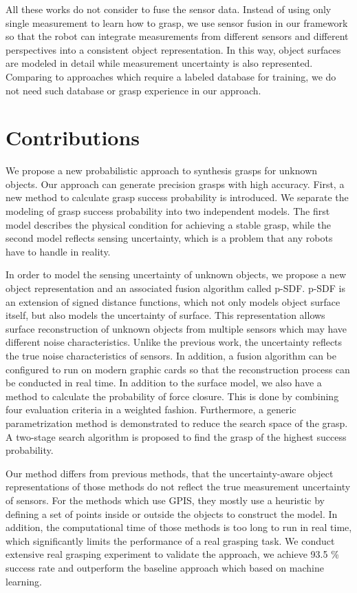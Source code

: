 All these works do not consider to fuse the sensor data. Instead of using only single measurement to learn how to grasp, we use sensor fusion in our framework so that the robot can integrate measurements from different sensors and different perspectives into a consistent object representation.  In this way, object surfaces are modeled in detail while measurement uncertainty is also represented. Comparing to approaches which require a labeled database for training, we do not need such database or grasp experience in our approach.  

\section{Contributions}
We propose a new probabilistic approach to synthesis grasps for unknown objects. Our approach can generate precision grasps with high accuracy. First, a new method to calculate grasp success probability is introduced. We separate the modeling of grasp success probability into two independent models. The first model describes the physical condition for achieving a stable grasp, while the second model reflects sensing uncertainty, which is a problem that any robots have to handle in reality. 

In order to model the sensing uncertainty of unknown objects, we propose a new object representation and an associated fusion algorithm called p-SDF. p-SDF is an extension of signed distance functions, which not only models object surface itself, but also models the uncertainty of surface. This representation allows surface reconstruction of unknown objects from multiple sensors which may have different noise characteristics. Unlike the previous work, the uncertainty reflects the true noise characteristics of sensors. In addition, a fusion algorithm can be configured to run on modern graphic cards so that the reconstruction process can be conducted in real time. In addition to the surface model, we also have a method to calculate the probability of force closure. This is done by combining four evaluation criteria in a weighted fashion. Furthermore, a generic parametrization method is demonstrated to reduce the search space of the grasp. A two-stage search algorithm is proposed to find the grasp of the highest success probability. 

Our method differs from previous methods, that the uncertainty-aware object representations of those methods do not reflect the true measurement uncertainty of sensors. For the methods which use GPIS, they mostly use a heuristic by defining a set of points inside or outside the objects to construct the model. In addition, the computational time of those methods is too long to run in real time, which significantly limits the performance of a real grasping task. We conduct extensive real grasping experiment to validate the approach, we achieve 93.5 \% success rate and outperform the baseline approach which based on machine learning. 

